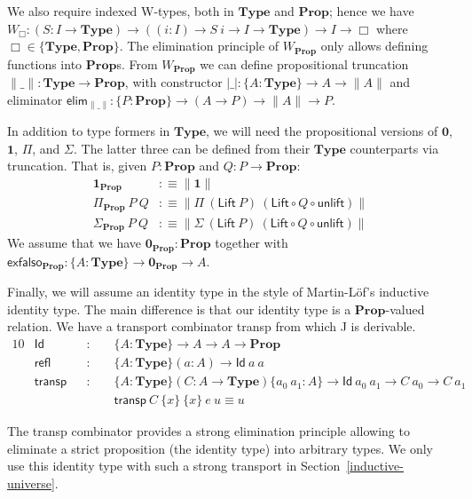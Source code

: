 \documentclass[a4paper,UKenglish,cleveref, autoref, thm-restate]{lipics-v2019}
\newcommand{\mType}{\mathbf{Type}}
\newcommand{\mProp}{\mathbf{Prop}}
\begin{document}
We also require indexed W-types, both in $\mType$ and $\mProp$; hence we have $W_\Box
: (S : I\to\mType) \to ((i:I)\to S\ i\to I \to \mType) \to I\to \Box$ where $\Box \in \{\mType, \mProp\}$.
The elimination principle of $W_\mProp$ only allows defining functions into $\mProp$s.
%
From $W_\mProp$ we can define propositional truncation $\|\_\| : \mType \to \mProp$, with constructor
  $|\_| : \{A : \mType \} \to A \to \| A \|$ and eliminator
  $\textsf{elim}_{\|\_\|} : \{P : \mProp \} \to (A \to P) \to \| A \| \to P$.

In addition to type formers in $\mType$, we will need the propositional versions
of $\mathbf{0}$, $\mathbf{1}$, $\Pi$, and $\Sigma$. The latter three can be defined from their
$\mType$ counterparts via truncation. That is, given $P : \mProp$ and $Q : P \to
\mProp$:
%
\begin{align*}
  \mathbf{1}_\mProp & :\equiv \| \mathbf{1} \| \\
  \Pi_\mProp\ P\ Q & :\equiv \| \Pi\ (\textsf{Lift} \ P)\ (\textsf{Lift} \circ Q \circ \textsf{unlift}) \| \\
  \Sigma_\mProp\ P\ Q & :\equiv \| \Sigma\ (\textsf{Lift} \ P)\ (\textsf{Lift} \circ Q \circ \textsf{unlift}) \|
\end{align*}
We assume that we have
$\mathbf{0}_\mProp:\mProp$ together with $\mathsf{exfalso}_\mProp :\{A:\mType \} \to \mathbf{0}_\mProp \to A$.

Finally, we will assume an identity type in the style of Martin-L\"of's
inductive identity type. The main difference is that our identity type is a
$\mProp$-valued relation. We have a transport combinator
\textsf{transp} from which \textsf{J} is derivable.
%
\begin{alignat*}{10}
  & \textsf{Id} && :\,\, && \{A : \mType \} \to A \to A \to \mProp \\
  & \textsf{refl} && : && \{A : \mType \} (a : A) \to \textsf{Id}\ a\ a \\
  & \textsf{transp} && : && \{A : \mType \} (C : A \to \mType) \{a_0\ a_1 : A\} \to \textsf{Id}\ a_0\ a_1 \to C\ a_0 \to C\ a_1 \\
  & && && \textsf{transp}\ C\ \{x\}\ \{x\}\ e\ u \equiv u
\end{alignat*}

The \textsf{transp} combinator provides a strong elimination principle allowing
to eliminate a strict proposition (the identity type) into arbitrary types.
%
We only use this identity type with such a strong transport in Section~\ref{inductive-universe}.
%
\end{document}
